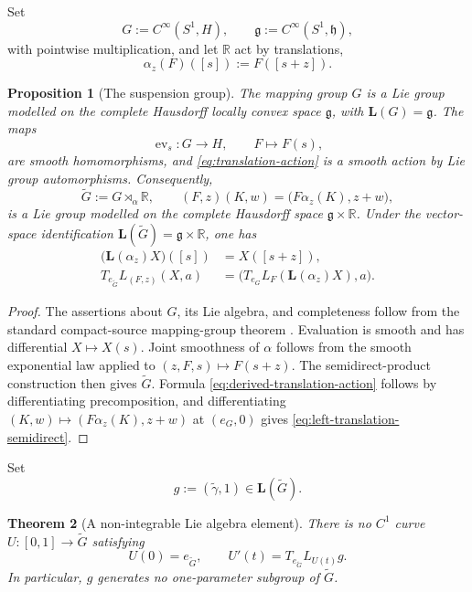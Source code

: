 \documentclass[11pt]{article}
\newtheorem{theorem}{Theorem}[section]
\newtheorem{proposition}[theorem]{Proposition}
\theoremstyle{remark}
\begin{document}
Set
\[
  G:=C^\infty(S^1,H),
  \qquad
  \mathfrak g:=C^\infty(S^1,\mathfrak h),
\]
with pointwise multiplication, and let $\mathbb R$ act by translations,
\begin{equation}
  \alpha_z(F)([s]):=F([s+z]).
  \label{eq:translation-action}
\end{equation}

\begin{proposition}[The suspension group]
\label{prop:suspension-group}
The mapping group $G$ is a Lie group modelled on the complete Hausdorff
locally convex space $\mathfrak g$, with $\mathbf L(G)=\mathfrak g$.  The
maps
\[
  \operatorname{ev}_s:G\to H,
  \qquad F\mapsto F(s),
\]
are smooth homomorphisms, and \eqref{eq:translation-action} is a smooth action
by Lie group automorphisms.  Consequently,
\[
  \widetilde G:=G\rtimes_\alpha\mathbb R,
  \qquad
  (F,z)(K,w)=\bigl(F\alpha_z(K),z+w\bigr),
\]
is a Lie group modelled on the complete Hausdorff space
$\mathfrak g\times\mathbb R$.  Under the vector-space identification
$\mathbf L(\widetilde G)=\mathfrak g\times\mathbb R$, one has
\begin{align}
  \bigl(\mathbf L(\alpha_z)X\bigr)([s])&=X([s+z]),
  \label{eq:derived-translation-action}\\
  T_{e_{\widetilde G}}L_{(F,z)}(X,a)
  &=\bigl(T_{e_G}L_F(\mathbf L(\alpha_z)X),a\bigr).
  \label{eq:left-translation-semidirect}
\end{align}
\end{proposition}

\begin{proof}
The assertions about $G$, its Lie algebra, and completeness follow from the
standard compact-source mapping-group theorem
\cite[Theorems~I.2(1) and I.3(1)]{NeebWagemann2007}.  Evaluation is smooth
and has differential $X\mapsto X(s)$.  Joint smoothness of $\alpha$ follows
from the smooth exponential law applied to
$(z,F,s)\mapsto F(s+z)$.  The semidirect-product construction then gives
$\widetilde G$.  Formula \eqref{eq:derived-translation-action} follows by
differentiating precomposition, and differentiating
$(K,w)\mapsto(F\alpha_z(K),z+w)$ at $(e_G,0)$ gives
\eqref{eq:left-translation-semidirect}.
\end{proof}

Set
\begin{equation}
  g:=(\widetilde\gamma,1)
  \in\mathbf L(\widetilde G).
  \label{eq:suspended-element}
\end{equation}

\begin{theorem}[A non-integrable Lie algebra element]
\label{thm:2.3}
There is no $C^1$ curve $U:[0,1]\to\widetilde G$ satisfying
\begin{equation}
  U(0)=e_{\widetilde G},
  \qquad
  U'(t)=T_{e_{\widetilde G}}L_{U(t)}g.
  \label{eq:suspended-autonomous-equation}
\end{equation}
In particular, $g$ generates no one-parameter subgroup of $\widetilde G$.
\end{theorem}
\end{document}
